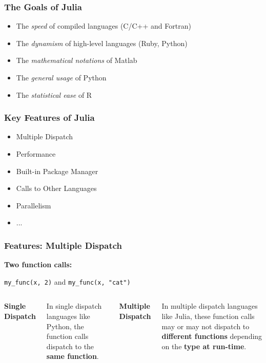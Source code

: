 \documentclass{beamer}
\begin{document}
\begin{frame}
	\frametitle{The Goals of Julia}
	\begin{itemize}
		\item The \textit{speed} of compiled languages (C/C++ and Fortran) \newline
		\item The \textit{dynamism} of high-level languages (Ruby, Python) \newline
		\item The \textit{mathematical notations} of Matlab \newline
		\item The \textit{general usage} of Python \newline
		\item The \textit{statistical ease} of R
	\end{itemize}
\end{frame}

\begin{frame}
	\frametitle{Key Features of Julia}

	\begin{itemize}
		\item Multiple Dispatch \newline
		\item Performance \newline
		\item Built-in Package Manager \newline
		\item Calls to Other Languages \newline
		\item Parallelism \newline
		\item ...
	\end{itemize}
\end{frame}

\begin{frame}[fragile]
	\frametitle{Features: Multiple Dispatch}

	\textbf{Two function calls:} \newline

	\verb|my_func(x, 2)| \quad and \quad \verb|my_func(x, "cat")| \newline

	\begin{columns}
		\column[T]{6cm}
		\textbf{Single Dispatch} \newline

		In single dispatch languages like Python, the function calls dispatch to the \textbf{same function}.

		\column[T]{6cm}
		\textbf{Multiple Dispatch} \newline

		In multiple dispatch languages like Julia, these function calls may or may not dispatch to \textbf{different functions} depending on the \textbf{type at run-time}.
	\end{columns}
\end{frame}
\end{document}
